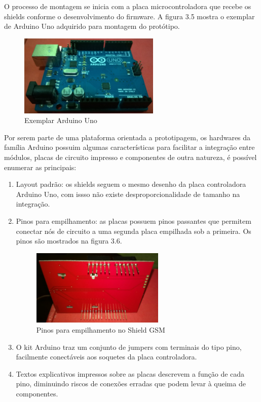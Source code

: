 O processo de montagem se inicia com a placa microcontroladora que recebe os shields conforme o desenvolvimento do firmware. A figura 3.5 mostra o exemplar de Arduino Uno adquirido para montagem do protótipo.

\begin{figure}[!htb]
	\centering
	\includegraphics[width=0.6\textwidth]{figures/arduinoUnoReal.jpg}
	\caption{Exemplar Arduino Uno}
	\label{1}
\end{figure}

Por serem parte de uma plataforma orientada a prototipagem, os hardwares da família Arduino possuim algumas características para facilitar a integração entre módulos, placas de circuito impresso e componentes de outra natureza, é possível enumerar as principais:

\begin{enumerate}
	\item Layout padrão: os shields seguem o mesmo desenho da placa controladora Arduino Uno, com issso não existe desproporcionalidade de tamanho na integração.
	\item Pinos para empilhamento: as placas possuem pinos passantes que permitem conectar nós de circuito a uma segunda placa empilhada sob a primeira. Os pinos são mostrados na figura 3.6.
	
\begin{figure}[!htb]
	\centering
	\includegraphics[width=0.6\textwidth]{figures/stackPins.jpg}
	\caption{Pinos para empilhamento no Shield GSM}
	\label{1}
\end{figure}	

	\item O kit Arduino traz um conjunto de jumpers com terminais do tipo pino, facilmente conectáveis aos soquetes da placa controladora.
	\item Textos explicativos impressos sobre as placas descrevem a função de cada pino, diminuindo riscos de conexões erradas que podem levar à queima de componentes.
	
\end{enumerate}


